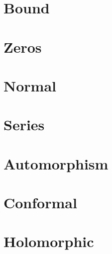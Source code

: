 \documentclass[12pt,letterpaper]{article}
\theoremstyle{plain}
\theoremstyle{definition}
\begin{document}
\section{Bound}
\begin{itemize}\setlength\itemsep{4em}\onlyitems[none, include=bound]
\mylist
\end{itemize}
\newpage

\section{Zeros}
\begin{itemize}\setlength\itemsep{4em}\onlyitems[none, include=zeros]
\mylist
\end{itemize}
\newpage

\section{Normal}
\begin{itemize}\setlength\itemsep{4em}\onlyitems[none, include=normal]
\mylist
\end{itemize}
\newpage

\section{Series}
\begin{itemize}\setlength\itemsep{4em}\onlyitems[none, include=series]
\mylist
\end{itemize}
\newpage

\section{Automorphism}
\begin{itemize}\setlength\itemsep{4em}\onlyitems[none, include=automorphism]
\mylist
\end{itemize}
\newpage

\section{Conformal}
\begin{itemize}\setlength\itemsep{4em}\onlyitems[none, include=conformal]
\mylist
\end{itemize}
\newpage

\section{Holomorphic}
\begin{itemize}\setlength\itemsep{4em}\onlyitems[none, include=holomorphic]
\mylist
\end{itemize}
\newpage
\end{document}
